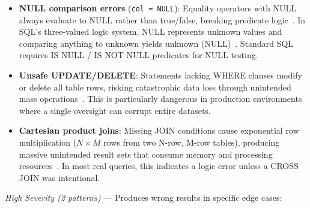 \documentclass[]{einformatica}
\begin{document}
\begin{itemize}
\item \textbf{NULL comparison errors} (\texttt{col = NULL}): Equality operators with NULL always evaluate to NULL rather than true/false, breaking predicate logic~\cite{karwin2010sqlantipatterns,date2012sqlrelational}. In SQL's three-valued logic system, NULL represents unknown values and comparing anything to unknown yields unknown (NULL)~\cite{date2012sqlrelational,iso9075_2_2016}. Standard SQL requires IS NULL / IS NOT NULL predicates for NULL testing.

\item \textbf{Unsafe UPDATE/DELETE}: Statements lacking WHERE clauses modify or delete all table rows, risking catastrophic data loss through unintended mass operations~\cite{karwin2010sqlantipatterns}. This is particularly dangerous in production environments where a single oversight can corrupt entire datasets.

\item \textbf{Cartesian product joins}: Missing JOIN conditions cause exponential row multiplication ($N \times M$ rows from two N-row, M-row tables), producing massive unintended result sets that consume memory and processing resources~\cite{karwin2010sqlantipatterns,ramakrishnan2003dbms}. In most real queries, this indicates a logic error unless a CROSS JOIN was intentional.
\end{itemize}

\textit{High Severity (2 patterns)} --- Produces wrong results in specific edge cases:
\end{document}
